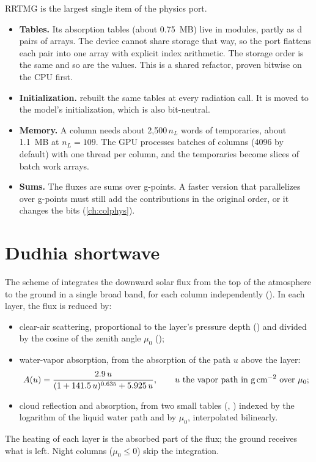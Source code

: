 \begin{portnote}
RRTMG is the largest single item of the physics port.
\begin{itemize}
  \item \textbf{Tables.} Its absorption tables (about 0.75~MB) live in modules, partly as d pairs of
    arrays. The device cannot share storage that way, so the port flattens each pair into one array with explicit
    index arithmetic. The storage order is the same and so are the values. This is a shared refactor, proven bitwise
    on the CPU first.
  \item \textbf{Initialization.}  rebuilt the same tables at every radiation call. It is moved to
    the model's initialization, which is also bit-neutral.
  \item \textbf{Memory.} A column needs about 2{,}500$\,n_L$ words of temporaries, about 1.1~MB at $n_L = 109$. The
    GPU processes batches of columns (4096 by default) with one thread per column, and the temporaries become slices
    of batch work arrays.
  \item \textbf{Sums.} The fluxes are sums over g-points. A faster version that parallelizes over g-points must still
    add the contributions in the original order, or it changes the bits (\cref{ch:colphys}).
\end{itemize}
\end{portnote}

\section{Dudhia shortwave}

The scheme of \citet{dudhia1989} integrates the downward solar flux from the top of the atmosphere to the ground in a
single broad band, for each column independently (). In each layer, the flux is
reduced by:
\begin{itemize}
  \item clear-air scattering, proportional to the layer's pressure depth () and divided by the cosine of
    the zenith angle $\mu_0$ ();
  \item water-vapor absorption, from the absorption of the path $u$ above the layer:
    \begin{equation}
      A(u) = \frac{2.9\,u}{(1 + 141.5\,u)^{0.635} + 5.925\,u}, \qquad u \text{ the vapor path in g\,cm}^{-2} \text{ over } \mu_0;
    \end{equation}
  \item cloud reflection and absorption, from two small tables (, ) indexed by the
    logarithm of the liquid water path and by $\mu_0$, interpolated bilinearly.
\end{itemize}
The heating of each layer is the absorbed part of the flux; the ground receives what is left. Night columns
($\mu_0 \le 0$) skip the integration.

